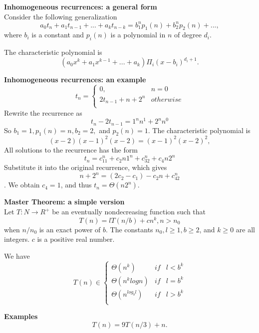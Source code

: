 \documentclass{seminar}
\begin{document}
\begin{slide}
{\bf Inhomogeneous recurrences: a general form}\\
Consider the following generalization
$$a_0t_n+a_1t_{n-1}+...+a_kt_{n-k}=b_1^n p_1(n)+b_2^n p_2(n)+...,$$
where $b_i$ is a constant and $p_i(n)$ is a polynomial in $n$ of degree $d_i$.

The characteristic polynomial is 
$$(a_0x^k+a_1x^{k-1}+...+a_k)\Pi_{i}(x-b_i)^{d_i+1}.$$
\end{slide}

\begin{slide}
{\bf Inhomogeneous recurrences: an example}\\
\[
t_n = \left\{
 \begin{array}{ll}
       0, & n=0 \\
       2t_{n-1}+n+2^n & otherwise \\
 \end{array}
 \right.
\]
Rewrite the recurrence as $$t_n-2t_{n-1}=1^nn^1+2^nn^0$$
So $b_1=1, p_1(n)=n, b_2=2,$ and $p_2(n)=1$.
The characteristic polynomial is
$$(x-2)(x-1)^2(x-2)=(x-1)^2(x-2)^2,$$
All solutions to the recurrence has the form\\
$$t_n=c_11^n+c_2n1^n+c_32^n+c_4n2^n$$
Substitute it into the original recurrence, which gives
$$n+2^n=(2c_2-c_1)-c_2n+c_42^n$$.
We obtain $c_4=1$, and thus $t_n=\Theta(n2^n)$.
\end{slide}

\begin{slide}
{\bf Master Theorem: a simple version} \\
Let $T: N \rightarrow R^+$ be an eventually nondecreasing function such that
$$ T(n) = lT(n/b)+cn^k, n>n_0$$ when $n/n_0$ is an exact power of $b$.
The constants $n_0, l \ge 1, b \ge 2$, and $k \ge 0$ are all integers. $c$ is a
positive real number.

We have 
\[
T(n) \in \left\{
  \begin{array}{lll}
  \Theta(n^k) &if&  l<b^k \\
  \Theta(n^k logn) &if&  l=b^k \\
  \Theta(n^{log_{b}{l}}) &if&  l>b^k \\
  \end{array}
  \right.
\]
\end{slide}

\begin{slide}
{\bf Examples}
$$T(n) = 9T(n/3)+n.$$
\end{slide} 
\end{document}
